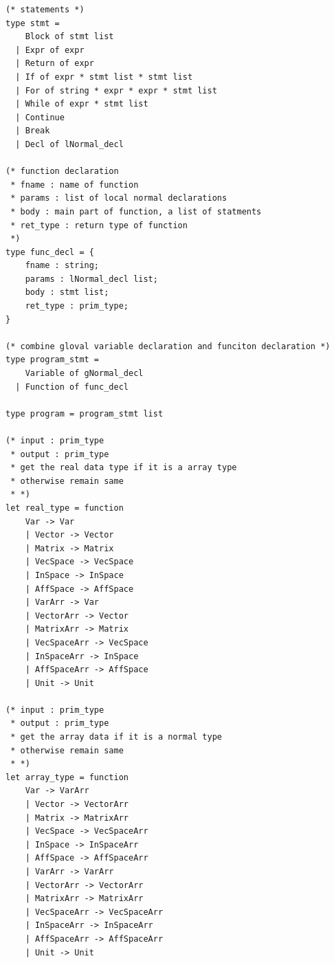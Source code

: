 \documentclass[12pt]{article} %
\begin{document}
\begin{lstlisting}[style=appendix, caption=ast.ml]
(* statements *)
type stmt =
    Block of stmt list
  | Expr of expr
  | Return of expr
  | If of expr * stmt list * stmt list
  | For of string * expr * expr * stmt list
  | While of expr * stmt list
  | Continue
  | Break
  | Decl of lNormal_decl 

(* function declaration 
 * fname : name of function
 * params : list of local normal declarations
 * body : main part of function, a list of statments
 * ret_type : return type of function
 *)
type func_decl = {
    fname : string;
    params : lNormal_decl list;
    body : stmt list;
    ret_type : prim_type;
}

(* combine gloval variable declaration and funciton declaration *)
type program_stmt =
    Variable of gNormal_decl
  | Function of func_decl

type program = program_stmt list

(* input : prim_type
 * output : prim_type
 * get the real data type if it is a array type 
 * otherwise remain same
 * *)
let real_type = function
    Var -> Var
    | Vector -> Vector
    | Matrix -> Matrix
    | VecSpace -> VecSpace
    | InSpace -> InSpace
    | AffSpace -> AffSpace
    | VarArr -> Var
    | VectorArr -> Vector
    | MatrixArr -> Matrix
    | VecSpaceArr -> VecSpace
    | InSpaceArr -> InSpace
    | AffSpaceArr -> AffSpace
    | Unit -> Unit 

(* input : prim_type
 * output : prim_type
 * get the array data if it is a normal type
 * otherwise remain same
 * *)
let array_type = function
    Var -> VarArr
    | Vector -> VectorArr
    | Matrix -> MatrixArr
    | VecSpace -> VecSpaceArr
    | InSpace -> InSpaceArr
    | AffSpace -> AffSpaceArr
    | VarArr -> VarArr
    | VectorArr -> VectorArr
    | MatrixArr -> MatrixArr
    | VecSpaceArr -> VecSpaceArr
    | InSpaceArr -> InSpaceArr
    | AffSpaceArr -> AffSpaceArr
    | Unit -> Unit
\end{lstlisting}
\end{document}
